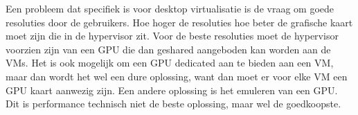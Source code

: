 Een probleem dat specifiek is voor desktop virtualisatie is de vraag om goede resoluties door de gebruikers. Hoe hoger de resoluties hoe beter de grafische kaart moet zijn die in de hypervisor zit. Voor de beste resoluties moet de hypervisor voorzien zijn van een GPU die dan geshared aangeboden kan worden aan de VMs. Het is ook mogelijk om een GPU dedicated aan te bieden aan een VM, maar dan wordt het wel een dure oplossing, want dan moet er voor elke VM een GPU kaart aanwezig zijn. Een andere oplossing is het emuleren van een GPU. Dit is performance technisch niet de beste oplossing, maar wel de goedkoopste.


